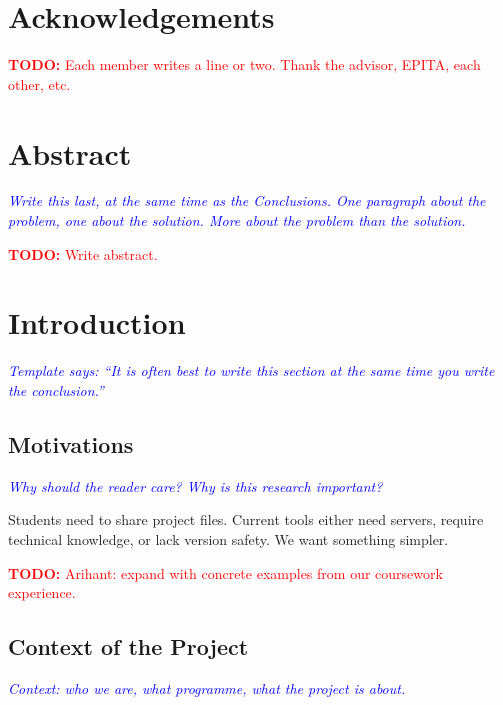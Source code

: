 \documentclass[12pt,oneside]{report}
\newcommand{\note}[1]{\textcolor{blue}{\textit{#1}}}
\newcommand{\todo}[1]{\textcolor{red}{\textbf{TODO:} #1}}
\begin{document}
\chapter*{Acknowledgements}
\todo{Each member writes a line or two. Thank the advisor, EPITA, each other, etc.}

\chapter*{Abstract}
\note{Write this last, at the same time as the Conclusions. One paragraph about the problem, one about the solution. More about the problem than the solution.}

\todo{Write abstract.}

\newpage
\tableofcontents
\newpage

\chapter{Introduction}

\note{Template says: ``It is often best to write this section at the same time you write the conclusion.''}

\section{Motivations}
\note{Why should the reader care? Why is this research important?}

Students need to share project files. Current tools either need servers, require technical knowledge, or lack version safety. We want something simpler.

\todo{Arihant: expand with concrete examples from our coursework experience.}

\section{Context of the Project}
\note{Context: who we are, what programme, what the project is about.}
\end{document}
